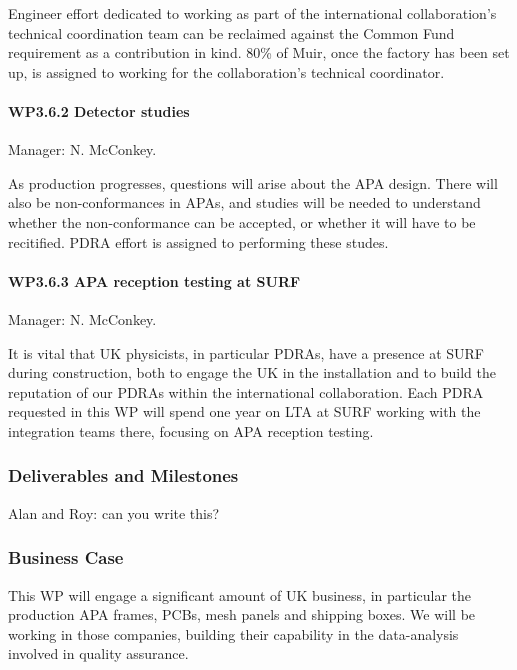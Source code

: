 Engineer effort dedicated to working as part of the international collaboration's technical coordination team can be reclaimed against the Common Fund requirement as a contribution in kind. 80\% of Muir, once the factory has been set up, is assigned to working for the collaboration's technical coordinator.

\paragraph{WP3.6.2 Detector studies} Manager: N. McConkey.

As production progresses, questions will arise about the APA design. There will also be non-conformances in APAs, and studies will be needed to understand whether the non-conformance can be accepted, or whether it will have to be recitified. PDRA effort is assigned to performing these studes.

\paragraph{WP3.6.3 APA reception testing at SURF} Manager: N. McConkey.

It is vital that UK physicists, in particular PDRAs, have a presence at SURF during construction, both to engage the UK in the installation and to build the reputation of our PDRAs within the international collaboration. Each PDRA requested in this WP will spend one year on LTA at SURF working with the integration teams there, focusing on APA reception testing.

\subsubsection{Deliverables and Milestones}

Alan and Roy: can you write this?

\subsubsection{Business Case}

This WP will engage a significant amount of UK business, in particular the production APA frames, PCBs, mesh panels and shipping boxes. We will be working in those companies, building their capability in the data-analysis involved in quality assurance.